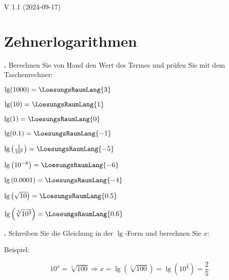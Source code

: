 
\renewcommand{\bbwAufgabenBlockID}{A2Log}

\renewcommand{\metaHeaderLine}{Logarithmen}
\renewcommand{\arbeitsblattTitel}{Algebra: Logarithmen}


\arbeitsblattHeader{}

\begin{center}V 1.1 (2024-09-17) \end{center}
\section{Zehnerlogarithmen}

\textbf{\bbwAufgabenNummer{}.}
Berechnen Sie von Hand den Wert des Termes und prüfen Sie mit dem Taschenrechner:

\begin{bbwAufgabenBlock}
\item $\lg(1000) = \LoesungsRaumLang{3}$
\item $\lg(10) = \LoesungsRaumLang{1}$
\item $\lg(1) = \LoesungsRaumLang{0}$
\item $\lg(0.1) = \LoesungsRaumLang{-1}$
\item $\lg\left(\frac1{10^5}\right) = \LoesungsRaumLang{-5}$
\item $\lg\left(10^{-6}\right) = \LoesungsRaumLang{-6}$
\item $\lg\left(0.0001\right) = \LoesungsRaumLang{-4}$
\item $\lg\left(\sqrt{10}\right) = \LoesungsRaumLang{0.5}$
\item $\lg\left(\sqrt[5]{10^3}\right) = \LoesungsRaumLang{0.6}$
\end{bbwAufgabenBlock}

\newpage


\textbf{\bbwAufgabenNummer{}.}
Schreiben Sie die Gleichung in der $\lg$-Form und berechnen Sie $x$:

Beispiel:

$$10^x=\sqrt[5]{100} \Longrightarrow   x=\lg\left(\sqrt[5]{100}\right)
= \lg\left(10^{\frac25}\right) = \frac25$$

